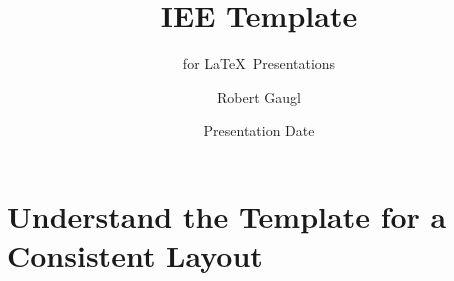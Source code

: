 \documentclass[aspectratio=169]{beamer}
\title[Short Title]{IEE Template}
\subtitle{for \LaTeX~Presentations}
\author{Robert Gaugl}
\date{Presentation Date}
\institute{Institute of Electricity Economics and Energy Innovation}
\begin{document}
\begin{frame}[plain]
    \maketitleslide
\end{frame}


\section{Understand the \textbf{Template} for a Consistent Layout}

\begin{frame}
    \agenda
\end{frame}
\end{document}
